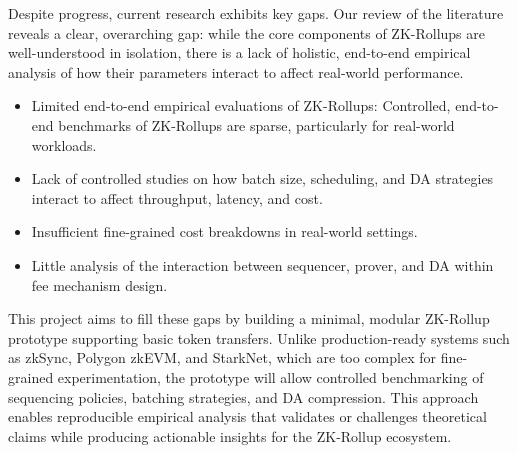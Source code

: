 Despite progress, current research exhibits key gaps. Our review of the literature reveals a clear, overarching gap: while the core components of ZK-Rollups are well-understood in isolation, there is a lack of holistic, end-to-end empirical analysis of how their parameters interact to affect real-world performance.
\vspace{12pt}
\begin{itemize}
\item Limited end-to-end empirical evaluations of ZK-Rollups: Controlled, end-to-end benchmarks of ZK-Rollups are sparse, particularly for real-world workloads.
\item Lack of controlled studies on how batch size, scheduling, and DA strategies interact to affect throughput, latency, and cost.
\item Insufficient fine-grained cost breakdowns in real-world settings.
\item Little analysis of the interaction between sequencer, prover, and DA within fee mechanism design.
\end{itemize}

\vspace{12pt}

\vspace{12pt}

This project aims to fill these gaps by building a minimal, modular ZK-Rollup prototype supporting basic token transfers. Unlike production-ready systems such as zkSync, Polygon zkEVM, and StarkNet, which are too complex for fine-grained experimentation, the prototype will allow controlled benchmarking of sequencing policies, batching strategies, and DA compression. This approach enables reproducible empirical analysis that validates or challenges theoretical claims while producing actionable insights for the ZK-Rollup ecosystem.